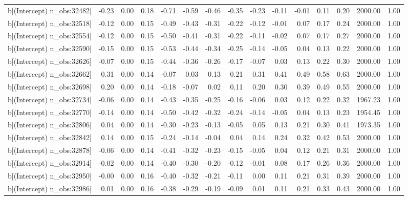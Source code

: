 \begin{table}[ht]
\begin{tabular}{rrrrrrrrrrrrrrr}
  b[(Intercept) n\_obs:32482] & -0.23 & 0.00 & 0.18 & -0.71 & -0.59 & -0.46 & -0.35 & -0.23 & -0.11 & -0.01 & 0.11 & 0.20 & 2000.00 & 1.00 \\ 
  b[(Intercept) n\_obs:32518] & -0.12 & 0.00 & 0.15 & -0.49 & -0.43 & -0.31 & -0.22 & -0.12 & -0.01 & 0.07 & 0.17 & 0.24 & 2000.00 & 1.00 \\ 
  b[(Intercept) n\_obs:32554] & -0.12 & 0.00 & 0.15 & -0.50 & -0.41 & -0.31 & -0.22 & -0.11 & -0.02 & 0.07 & 0.17 & 0.27 & 2000.00 & 1.00 \\ 
  b[(Intercept) n\_obs:32590] & -0.15 & 0.00 & 0.15 & -0.53 & -0.44 & -0.34 & -0.25 & -0.14 & -0.05 & 0.04 & 0.13 & 0.22 & 2000.00 & 1.00 \\ 
  b[(Intercept) n\_obs:32626] & -0.07 & 0.00 & 0.15 & -0.44 & -0.36 & -0.26 & -0.17 & -0.07 & 0.03 & 0.13 & 0.22 & 0.30 & 2000.00 & 1.00 \\ 
  b[(Intercept) n\_obs:32662] & 0.31 & 0.00 & 0.14 & -0.07 & 0.03 & 0.13 & 0.21 & 0.31 & 0.41 & 0.49 & 0.58 & 0.63 & 2000.00 & 1.00 \\ 
  b[(Intercept) n\_obs:32698] & 0.20 & 0.00 & 0.14 & -0.18 & -0.07 & 0.02 & 0.11 & 0.20 & 0.30 & 0.39 & 0.49 & 0.55 & 2000.00 & 1.00 \\ 
  b[(Intercept) n\_obs:32734] & -0.06 & 0.00 & 0.14 & -0.43 & -0.35 & -0.25 & -0.16 & -0.06 & 0.03 & 0.12 & 0.22 & 0.32 & 1967.23 & 1.00 \\ 
  b[(Intercept) n\_obs:32770] & -0.14 & 0.00 & 0.14 & -0.50 & -0.42 & -0.32 & -0.24 & -0.14 & -0.05 & 0.04 & 0.13 & 0.23 & 1954.45 & 1.00 \\ 
  b[(Intercept) n\_obs:32806] & 0.04 & 0.00 & 0.14 & -0.30 & -0.23 & -0.13 & -0.05 & 0.05 & 0.13 & 0.21 & 0.30 & 0.41 & 1973.35 & 1.00 \\ 
  b[(Intercept) n\_obs:32842] & 0.14 & 0.00 & 0.15 & -0.24 & -0.14 & -0.04 & 0.04 & 0.14 & 0.24 & 0.32 & 0.42 & 0.53 & 2000.00 & 1.00 \\ 
  b[(Intercept) n\_obs:32878] & -0.06 & 0.00 & 0.14 & -0.41 & -0.32 & -0.23 & -0.15 & -0.05 & 0.04 & 0.12 & 0.21 & 0.31 & 2000.00 & 1.00 \\ 
  b[(Intercept) n\_obs:32914] & -0.02 & 0.00 & 0.14 & -0.40 & -0.30 & -0.20 & -0.12 & -0.01 & 0.08 & 0.17 & 0.26 & 0.36 & 2000.00 & 1.00 \\ 
  b[(Intercept) n\_obs:32950] & -0.00 & 0.00 & 0.16 & -0.40 & -0.32 & -0.21 & -0.11 & 0.00 & 0.11 & 0.21 & 0.31 & 0.39 & 2000.00 & 1.00 \\ 
  b[(Intercept) n\_obs:32986] & 0.01 & 0.00 & 0.16 & -0.38 & -0.29 & -0.19 & -0.09 & 0.01 & 0.11 & 0.21 & 0.33 & 0.43 & 2000.00 & 1.00 \\ 

\end{tabular}
\end{table}
